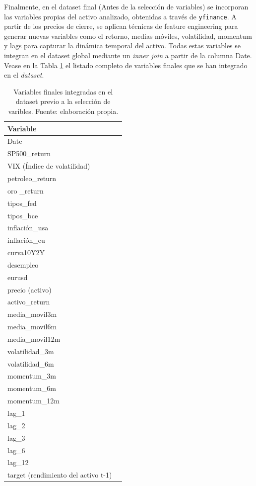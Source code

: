 Finalmente, en el dataset final (Antes de la selección de variables) se incorporan las variables propias del activo analizado, obtenidas a través de \texttt{yfinance}. A partir de los precios de cierre, se aplican técnicas de feature engineering para generar nuevas variables como el retorno, medias móviles, volatilidad, momentum y lags para capturar la dinámica temporal del activo. Todas estas variables se integran en el dataset global mediante un \emph{inner join} a partir de la columna Date. Vease en la Tabla \ref{tab:variables_finales} el listado completo de variables finales que se han integrado en el \emph{dataset}.

\begin{table}[H]
\centering
\begin{tabular}{|p{4cm}|p{10cm}|}
\hline
\textbf{Variable} \\
\hline
Date \\
\hline
SP500\_return \\
\hline
VIX (Índice de volatilidad) \\
\hline
petroleo\_return \\
\hline
oro \_return\\
\hline
tipos\_fed \\
\hline
tipos\_bce \\
\hline
inflación\_usa \\
\hline
inflación\_eu \\
\hline
curva10Y2Y \\
\hline
desempleo \\
\hline
eurusd \\
\hline
precio (activo) \\
\hline
activo\_return \\
\hline
media\_movil3m \\
\hline
media\_movil6m \\
\hline
media\_movil12m \\
\hline
volatilidad\_3m \\
\hline
volatilidad\_6m \\
\hline
momentum\_3m \\
\hline
momentum\_6m \\
\hline
momentum\_12m \\
\hline
lag\_1 \\
\hline
lag\_2 \\
\hline
lag\_3 \\
\hline
lag\_6 \\
\hline
lag\_12 \\
\hline
target (rendimiento del activo t-1) \\
\end{tabular}
\label{tab:variables_finales}
\caption{Variables finales integradas en el dataset previo a la selección de varibles. Fuente: elaboración propia.}
\end{table}


